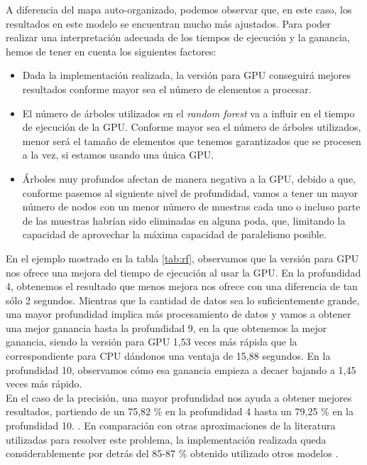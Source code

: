 A diferencia del mapa auto-organizado, podemos observar que, en este caso, los resultados en este modelo se encuentran mucho más ajustados. Para poder realizar una interpretación adecuada de los tiempos de ejecución y la ganancia, hemos de tener en cuenta los siguientes factores:

\begin{itemize}
	\item Dada la implementación realizada, la versión para GPU conseguirá mejores resultados conforme mayor sea el número de elementos a procesar.
	\item El número de árboles utilizados en el \textit{random forest} va a influir en el tiempo de ejecución de la GPU. Conforme mayor sea el número de árboles utilizados, menor será el tamaño de elementos que tenemos garantizados que se procesen a la vez, si estamos usando una única GPU.
	\item Árboles muy profundos afectan de manera negativa a la GPU, debido a que, conforme pasemos al siguiente nivel de profundidad, vamos a tener un mayor número de nodos con un menor número de muestras cada uno o incluso parte de las muestras habrían sido eliminadas en alguna poda, que, limitando la capacidad de aprovechar la máxima capacidad de paralelismo posible.
\end{itemize}

En el ejemplo mostrado en la tabla \ref{tab:rf}, observamos que la versión para GPU nos ofrece una mejora del tiempo de ejecución al usar la GPU. En la profundidad 4, obtenemos el resultado que menos mejora nos ofrece con una diferencia de tan sólo 2 segundos. Mientras que la cantidad de datos sea lo suficientemente grande, una mayor profundidad implica más procesamiento de datos y vamos a obtener una mejor ganancia hasta la profundidad 9, en la que obtenemos la mejor ganancia, siendo la versión para GPU 1,53 veces más rápida que la correspondiente para CPU dándonos una ventaja de 15,88 segundos. En la profundidad 10, observamos cómo esa ganancia empieza a decaer bajando a 1,45 veces más rápido. \\

En el caso de la precisión, una mayor profundidad nos ayuda a obtener mejores resultados, partiendo de un 75,82 \% en la profundidad 4 hasta un 79,25 \% en la profundidad 10. . En comparación con otras aproximaciones de la literatura utilizadas para resolver este problema, la implementación realizada queda considerablemente por detrás del 85-87 \% obtenido utilizado otros modelos \cite{susy}. \\

